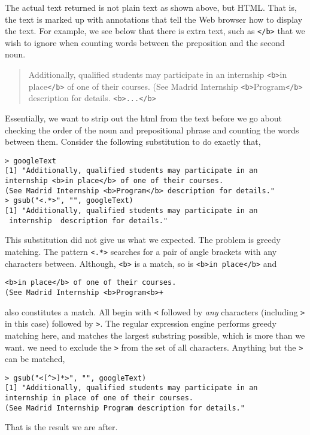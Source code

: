 The actual text returned is not plain text as shown above, but
HTML. That is, the text is marked up with annotations that tell the
Web browser how to display the text.  For example, we see below that
there is extra text, such as \verb+</b>+ that we wish to ignore when
counting words between the preposition and the second noun.
\begin{quote}
Additionally, qualified students may participate in an 
internship \verb+<b>+in place\verb+</b>+ of one of their courses. 
(See Madrid Internship \verb+<b>+Program\verb+</b>+ description for details. 
\verb+<b>...</b>+
\end{quote}
Essentially, we want to strip out the html from the text before we go
about checking the order of the noun and prepositional phrase and
counting the words between them.  Consider the following substitution
to do exactly that, 
{\footnotesize{
\begin{verbatim}
> googleText
[1] "Additionally, qualified students may participate in an 
internship <b>in place</b> of one of their courses. 
(See Madrid Internship <b>Program</b> description for details."
> gsub("<.*>", "", googleText)
[1] "Additionally, qualified students may participate in an
 internship  description for details."
\end{verbatim}
}}
\noindent 
This substitution did not give us what we expected.  The problem
is greedy matching.  The pattern \verb+<.*>+ searches for a pair of
angle brackets with any characters between.  Although, \verb+<b>+ is a
match, so is \verb+<b>in place</b>+ and 
{\footnotesize{
\begin{verbatim}
<b>in place</b> of one of their courses. 
(See Madrid Internship <b>Program<b>+
\end{verbatim}
}}
\noindent 
also constitutes a match.  All begin with \verb+<+ followed by
\textit{any} characters (including \verb+>+ in this case) followed by
\verb+>+.  The regular expression engine performs greedy matching
here, and matches the largest substring possible, which is more than
we want.  we need to exclude the \verb+>+ from the set of all
characters. Anything but the \verb+>+ can be matched, 
{\footnotesize{
\begin{verbatim}
> gsub("<[^>]*>", "", googleText)
[1] "Additionally, qualified students may participate in an 
internship in place of one of their courses. 
(See Madrid Internship Program description for details."
\end{verbatim}
}}
\noindent
That is the result we are after.


